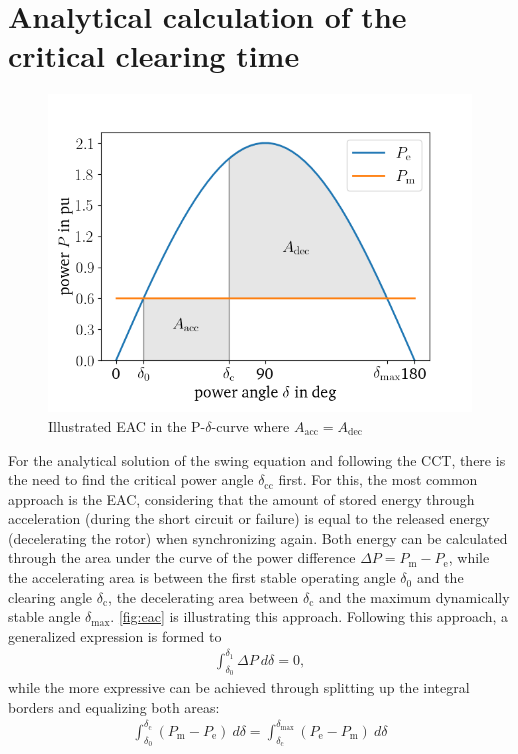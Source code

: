 \section{Analytical calculation of the critical clearing time}
\label{sec:analytical-method}

\begin{figure}
        \centering
        \includegraphics[width=.6\textwidth]{python/plots/eac.png}
        \caption{Illustrated \acf{EAC} in the P-$\delta$-curve where $A_\mathrm{acc}=A_\mathrm{dec}$}
        \label{fig:eac}
\end{figure}
For the analytical solution of the swing equation and following the \acs{CCT}, there is the need to find the critical power angle $\delta_\mathrm{cc}$ first. For this, the most common approach is the \acf{EAC}, considering that the amount of stored energy through acceleration (during the short circuit or failure) is equal to the released energy (decelerating the rotor) when synchronizing again. Both energy can be calculated through the area under the curve of the power difference $\Delta P=P_\mathrm{m}-P_\mathrm{e}$, while the accelerating area is between the first stable operating angle $\delta_\mathrm{0}$ and the clearing angle $\delta_\mathrm{c}$, the decelerating area between $\delta_\mathrm{c}$ and the maximum dynamically stable angle $\delta_\mathrm{max}$. \autoref{fig:eac} is illustrating this approach. Following this approach, a generalized expression is formed to
\begin{align}
        \int_{\delta_\mathrm{0}}^{\delta_\mathrm{1}}\Delta P~d\delta = 0 \label{eq:gen-eac},
\end{align}
while the more expressive can be achieved through splitting up the integral borders and equalizing both areas:
\begin{align}
        \int_{\delta_\mathrm{0}}^{\delta_\mathrm{c}}(P_\mathrm{m}-P_\mathrm{e})~d\delta = \int_{\delta_\mathrm{c}}^{\delta_\mathrm{max}}(P_\mathrm{e}-P_\mathrm{m})~d\delta \label{eq:big-eac}
\end{align}
